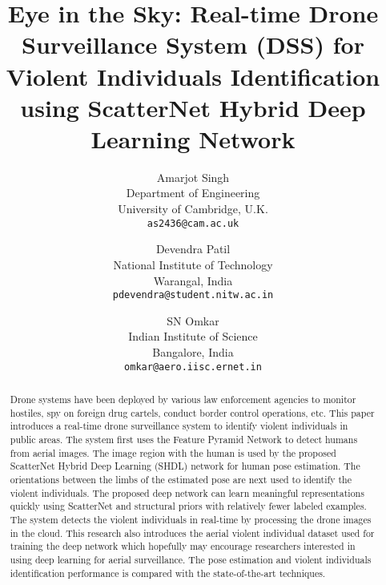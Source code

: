 \documentclass[10pt,twocolumn,letterpaper]{article}
\title{Eye in the Sky: Real-time Drone Surveillance System (DSS) for Violent Individuals Identification using ScatterNet Hybrid Deep Learning Network}
\begin{document}
\author{Amarjot Singh\\
Department of Engineering\\
University of Cambridge, U.K.\\
{\tt\small as2436@cam.ac.uk} \\
\and
Devendra Patil\\
National Institute of Technology\\
Warangal, India\\
{\tt\small pdevendra@student.nitw.ac.in} \\
\and
SN Omkar\\
Indian Institute of Science\\
Bangalore, India\\
{\tt\small omkar@aero.iisc.ernet.in} \\
}

\maketitle

\begin{abstract}
Drone systems have been deployed by various law enforcement agencies to monitor hostiles, spy on foreign drug cartels, conduct border control operations, etc. This paper introduces a real-time drone surveillance system to identify violent individuals in public areas. The system first uses the Feature Pyramid Network to detect humans from aerial images. The image region with the human is used by the proposed ScatterNet Hybrid Deep Learning (SHDL) network for human pose estimation. The orientations between the limbs of the estimated pose are next used to identify the violent individuals. The proposed deep network can learn meaningful representations quickly using ScatterNet and structural priors with relatively fewer labeled examples. The system detects the violent individuals in real-time by processing the drone images in the cloud. This research also introduces the aerial violent individual dataset used for training the deep network which hopefully may encourage researchers interested in using deep learning for aerial surveillance. The pose estimation and violent individuals identification performance is compared with the state-of-the-art techniques.
\end{abstract}
\end{document}
